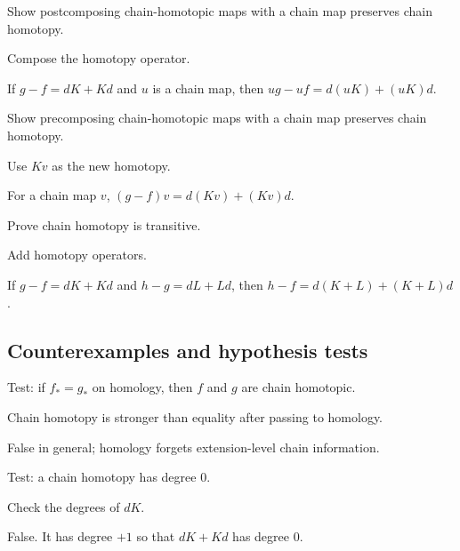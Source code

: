 \begin{exercise}\label{exr:viii22-ped-07}
Show postcomposing chain-homotopic maps with a chain map preserves chain homotopy.
\end{exercise}
\begin{hint}
Compose the homotopy operator.
\end{hint}
\begin{solution}
If $g-f=dK+Kd$ and $u$ is a chain map, then $ug-uf=d(uK)+(uK)d$.
\end{solution}

\begin{exercise}\label{exr:viii22-ped-08}
Show precomposing chain-homotopic maps with a chain map preserves chain homotopy.
\end{exercise}
\begin{hint}
Use $Kv$ as the new homotopy.
\end{hint}
\begin{solution}
For a chain map $v$, $(g-f)v=d(Kv)+(Kv)d$.
\end{solution}

\begin{exercise}[Transitivity]\label{exr:viii22-ped-09}
Prove chain homotopy is transitive.
\end{exercise}
\begin{hint}
Add homotopy operators.
\end{hint}
\begin{solution}
If $g-f=dK+Kd$ and $h-g=dL+Ld$, then $h-f=d(K+L)+(K+L)d$.
\end{solution}

\subsection*{Counterexamples and hypothesis tests}

\begin{exercise}\label{exr:viii22-ped-10}
Test: if $f_*=g_*$ on homology, then $f$ and $g$ are chain homotopic.
\end{exercise}
\begin{hint}
Chain homotopy is stronger than equality after passing to homology.
\end{hint}
\begin{solution}
False in general; homology forgets extension-level chain information.
\end{solution}

\begin{exercise}\label{exr:viii22-ped-11}
Test: a chain homotopy has degree $0$.
\end{exercise}
\begin{hint}
Check the degrees of $dK$.
\end{hint}
\begin{solution}
False. It has degree $+1$ so that $dK+Kd$ has degree $0$.
\end{solution}

